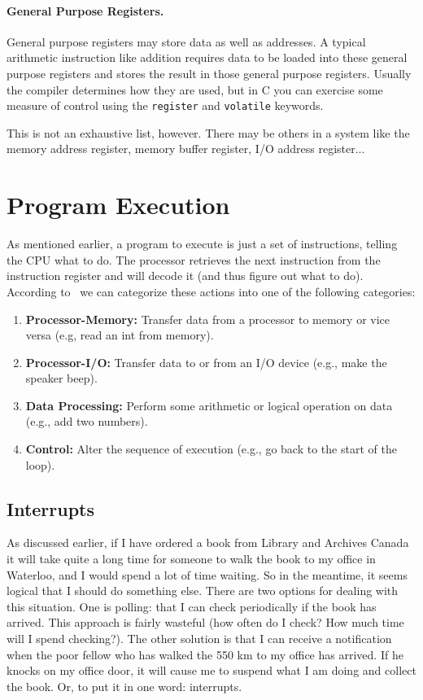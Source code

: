 \paragraph{General Purpose Registers.} General purpose registers may store data as well as addresses. A typical arithmetic instruction like addition requires data to be loaded into these general purpose registers and stores the result in those general purpose registers. Usually the compiler determines how they are used, but in C you can exercise some measure of control using the \texttt{register} and \texttt{volatile} keywords.

This is not an exhaustive list, however. There may be others in a system like the memory address register, memory buffer register, I/O address register...


\section*{Program Execution}

As mentioned earlier, a program to execute is just a set of instructions, telling the CPU what to do. The processor retrieves the next instruction from the instruction register and will decode it (and thus figure out what to do). According to~\cite{osi} we can categorize these actions into one of the following categories:

\begin{enumerate}
	\item \textbf{Processor-Memory:} Transfer data from a processor to memory or vice versa (e.g, read an int from memory).
	\item \textbf{Processor-I/O:} Transfer data to or from an I/O device (e.g., make the speaker beep).
	\item \textbf{Data Processing:} Perform some arithmetic or logical operation on data (e.g., add two numbers).
	\item \textbf{Control:} Alter the sequence of execution (e.g., go back to the start of the loop).
\end{enumerate}


\subsection*{Interrupts}

As discussed earlier, if I have ordered a book from Library and Archives Canada it will take quite a long time for someone to walk the book to my office in Waterloo, and I would spend a lot of time waiting. So in the meantime, it seems logical that I should do something else. There are two options for dealing with this situation. One is polling: that I can check periodically if the book has arrived. This approach is fairly wasteful (how often do I check? How much time will I spend checking?). The other solution is that I can receive a notification when the poor fellow who has walked the 550 km to my office has arrived. If he knocks on my office door, it will cause me to suspend what I am doing and collect the book. Or, to put it in one word: interrupts.

